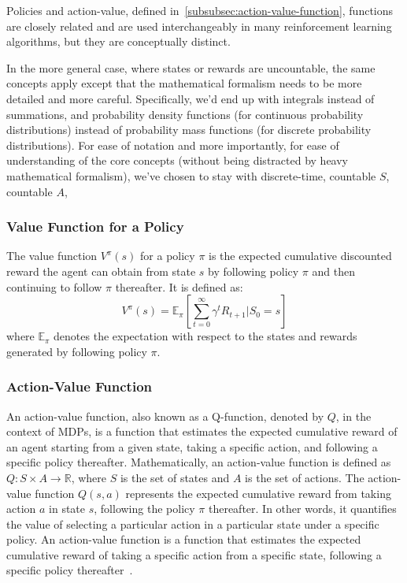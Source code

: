 \documentclass[../xlapes02]{subfiles}
\begin{document}
    Policies and action-value, defined in~\cref{subsubsec:action-value-function}, functions are closely related and are used interchangeably in many reinforcement learning algorithms, but they are conceptually distinct.

    In the more general case, where states or rewards are uncountable, the same concepts apply except that the mathematical formalism needs to be more detailed and more careful. Specifically, we'd end up with integrals instead of summations, and probability density functions (for continuous probability distributions) instead of probability mass functions (for discrete probability distributions). For ease of notation and more importantly, for ease of understanding of the core concepts (without being distracted by heavy mathematical formalism), we've chosen to stay with discrete-time, countable $S$, countable $A$,

    \subsubsection{Value Function for a Policy}
    The value function $V^{\pi}(s)$ for a policy $\pi$ is the expected cumulative discounted reward the agent can obtain from state $s$ by following policy $\pi$ and then continuing to follow $\pi$ thereafter. It is defined as:
    \[
        V^{\pi}(s) = \mathbb{E}_{\pi}\left[\sum_{t=0}^{\infty} \gamma^t R_{t+1} | S_0 = s\right]
    \]
    where $\mathbb{E}_{\pi}$ denotes the expectation with respect to the states and rewards generated by following policy $\pi$.

    \subsubsection{Action-Value Function}
    An action-value function, also known as a Q-function, denoted by $Q$, in the context of MDPs, is a function that estimates the expected cumulative reward of an agent starting from a given state, taking a specific action, and following a specific policy thereafter. Mathematically, an action-value function is defined as $Q: S \times A \rightarrow \mathbb{R}$, where $S$ is the set of states and $A$ is the set of actions. The action-value function $Q(s,a)$ represents the expected cumulative reward from taking action $a$ in state $s$, following the policy $\pi$ thereafter. In other words, it quantifies the value of selecting a particular action in a particular state under a specific policy. An action-value function is a function that estimates the expected cumulative reward of taking a specific action from a specific state, following a specific policy thereafter~\cite{GPT3.5}.
\end{document}
